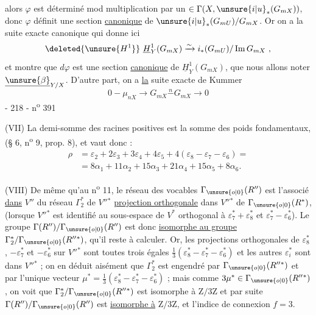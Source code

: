  alors $\varphi$ est déterminé  mod multiplication par un $\in\Gamma(X,\unsure{i|u}_*(G_{mX}))$, donc  $\varphi$ définit une section \deleted{$\varphi\in$} \uline{canonique} de  $\unsure{i|u}_*(G_{mU})/G_{mX}$. Or on a la suite exacte canonique
qui donne ici
\[
\deleted{\unsure{H^1}}\ \underline H^1_Y(G_{mX})\xrightarrow{\sim}i_*(G_{mU})/\operatorname{Im}G_{mX}\ ,
\]
et montre que $d\varphi$ est une section \uline{canonique} de $\underline H^1_Y(G_{mX})$, que nous allons noter  $\underline{\unsure{\beta}}_{Y/X}$. D'autre part, on a \uline{la} suite exacte de Kummer
\[
0\mathbin{-}\mu_{nX}\longrightarrow G_{mX}\mathrel{\overset{n}{-}}G_{mX}\longrightarrow0
\]
- 218 - \hfill n\textsuperscript{o} 391

(VII) La demi-somme des racines positives est la somme des poids fondamentaux, (§ 6, n\textsuperscript{o} 9, prop. 8), et vaut donc :
\[
\begin{aligned}
\rho&=\varepsilon_2+2\varepsilon_3+3\varepsilon_4+4\varepsilon_5+4(\varepsilon_8-\varepsilon_7-\varepsilon_6)=\\
&=8\alpha_1+11\alpha_2+15\alpha_3+21\alpha_4+15\alpha_5+8\alpha_6.
\end{aligned}
\]

(VIII) De même qu'au n\textsuperscript{o} 11, le réseau des vocables $\Gamma_{\unsure{o|0}}(R'')$ est l'associé \uline{dans} $V''$ du réseau $\Gamma_2^*$ de $V''{}^*$ \uline{projection orthogonale} dans $V''{}^*$ de $\Gamma_{\unsure{o|0}}(R^*)$, (lorsque $V''{}^*$ est identifié au sous-espace de $V^*$ orthogonal à $\varepsilon_7^*+\varepsilon_8^*$ et $\varepsilon_7^*-\varepsilon_6^*$). Le groupe $\Gamma(R'')/\Gamma_{\unsure{o|0}}(R'')$ est donc \uline{isomorphe au groupe} $\Gamma_2^*/\Gamma_{\unsure{o|0}}(R''{}^*)$, qu'il reste à calculer. Or, les projections orthogonales de $\varepsilon_8^*$, $-\varepsilon_7^*$ et $-\varepsilon_6^*$ sur $V''{}^*$ sont toutes trois égales $\frac13(\varepsilon_8^*-\varepsilon_7^*-\varepsilon_6^*)$ et les autres $\varepsilon_i^*$ sont dans $V''{}^*$ ; on en déduit aisément que $\Gamma_2^*$ est engendré par $\Gamma_{\unsure{o|0}}(R''{}^*)$ et par l'unique vecteur $\mu^*=\frac13(\varepsilon_8^*-\varepsilon_7^*-\varepsilon_6^*)$ ; mais comme $3\mu^*\in\Gamma_{\unsure{o|0}}(R''{}^*)$, on voit que $\Gamma_2^*/\Gamma_{\unsure{o|0}}(R''{}^*)$ est isomorphe à $\mathrm Z/3\mathrm Z$ et par suite $\Gamma(R'')/\Gamma_{\unsure{o|0}}(R'')$ est \uline{isomorphe à} $\mathrm Z/3\mathrm Z$, et l'indice de connexion $f=3$.

